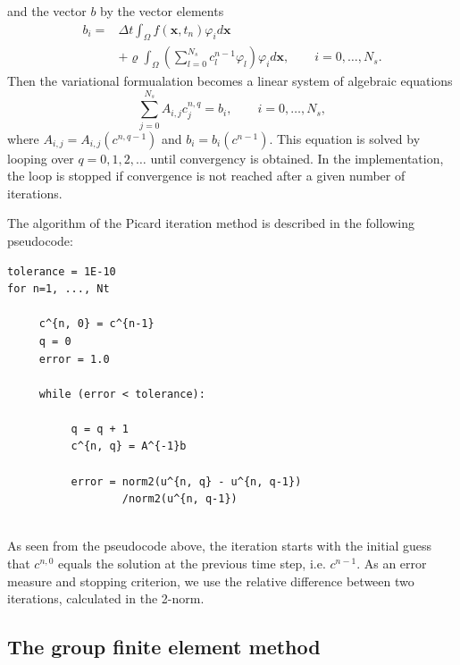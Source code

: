 \documentclass[twoside]{article}
\begin{document}
and the vector $b$ by the vector elements
\begin{align}
  b_{i} =& \Delta t \int_{\Omega }f(\mathbf{x}, t_{n})\varphi_{i}d\mathbf{x} \nonumber \\
  & + \varrho \int_{\Omega }\left( \sum_{l=0}^{N_{s}}c_{l}^{n-1}\varphi_{l}\right) \varphi_{i}d\mathbf{x}, \qquad i = 0, \dots , N_{s}.
\end{align}
Then the variational formualation becomes a linear system of algebraic equations
\begin{equation}
  \sum_{j=0}^{N_{s}}A_{i, j}c_{j}^{n, q} = b_{i}, \qquad i = 0, \dots , N_{s},
\end{equation}
where $A_{i, j} = A_{i, j}(c^{n, q-1})$ and $b_{i} = b_{i}(c^{n-1})$. This equation is solved by looping over $q = 0, 1, 2, \dots $ until convergency is obtained. In the implementation, the loop is stopped if convergence is not reached after a given number of iterations. 

The algorithm of the Picard iteration method is described in the following pseudocode:
\begin{verbatim}
tolerance = 1E-10
for n=1, ..., Nt
     
     c^{n, 0} = c^{n-1}
     q = 0
     error = 1.0

     while (error < tolerance):
     
          q = q + 1
          c^{n, q} = A^{-1}b

          error = norm2(u^{n, q} - u^{n, q-1})
                  /norm2(u^{n, q-1})
 

\end{verbatim}
As seen from the pseudocode above, the iteration starts with the initial guess that $c^{n, 0}$ equals the solution at the previous time step, i.e. $c^{n-1}$. As an error measure and stopping criterion, we use the relative difference between two iterations, calculated in the 2-norm.

\subsection{The group finite element method}
\end{document}
